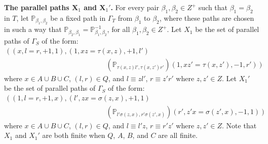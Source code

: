 \documentclass[11pt]{amsart}
\theoremstyle{plain}
\begin{document}
\noindent \textbf{The parallel paths $\mathbf X_1$ and $\mathbf X_1'$.} For every pair $\beta_1, \beta_2 \in Z^+$ such that $\beta_1 = \beta_2$ in $T$, let $\mathbb{P}_{\beta_1,\beta_2}$ be a fixed path in $\Gamma_T$ from $\beta_1$ to $\beta_2$, where these paths are chosen in such a way that ${\mathbb{P}}_{\beta_2, \beta_1} = {\mathbb{P}}_{\beta_1, \beta_2}^{-1}$, for all $\beta_1, \beta_2 \in Z^+$. Let $X_1$ be the set of parallel paths of $\Gamma_S$ of the form:
\begin{align*}
( \ (x, l=r, +1, 1),
(1, xz = \tau(x,z), +1, l')
\quad \quad \quad \quad \quad \quad \quad \quad \quad \quad \quad \quad \quad \quad
\\
\quad \quad \quad \quad \quad \quad \quad \quad \quad \quad \quad \quad \quad \quad
({\mathbb{P}}_{\tau(x,z)l', \tau(x,z')r'})
(1, xz' = \tau(x,z'), -1, r') \ )
\end{align*}
where $x \in A \cup B \cup C$, $(l,r) \in Q$, and $l \equiv zl'$, $r \equiv z'r'$ where $z,z' \in Z$. Let $X_1'$ be the set of parallel paths of $\Gamma_S$ of the form:
\begin{align*}
( \ (1, l=r, +1, x),
(l', zx = \sigma(z,x), +1, 1)
\quad \quad \quad \quad \quad \quad \quad \quad \quad \quad \quad \quad \quad \quad
\\
\quad \quad \quad \quad \quad \quad \quad \quad \quad \quad \quad \quad \quad \quad
({\mathbb{P}}_{l' \sigma(z,x), r'\sigma(z',x)})
(r', z'x = \sigma(z',x), -1, 1) \ )
\end{align*}
where $x \in A \cup B \cup C$, $(l,r) \in Q$, and $l \equiv l'z$, $r \equiv r'z'$ where $z,z' \in Z$. Note that $X_1$ and $X_1'$ are both finite when $Q$, $A$, $B$, and $C$ are all finite.
\end{document}

